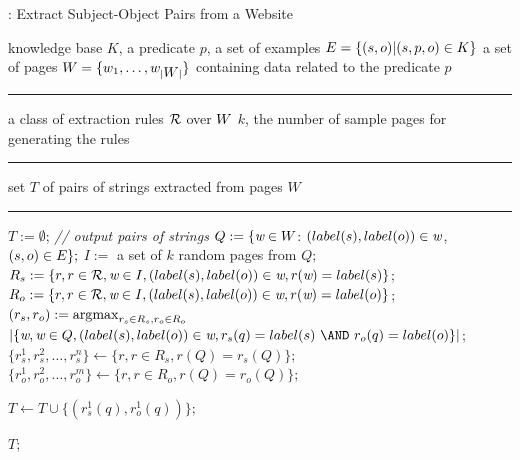 

\begin{algorithm}[tbh]
\caption{{\alfrex}: Extract Subject-Object Pairs from a Website}\label{lst:learning-wrappers}
\label{alg:alfrex}
\begin{algorithmic}[1]
\renewcommand{\algorithmicensure}{\textbf{Output:}}
\newcommand{\LET}{\mbox{\textbf{let}}}
\renewcommand{\algorithmicrequire}{\textbf{Input:}}
\REQUIRE knowledge base $K$, a predicate $p$, a set of examples $\mbox{\ensuremath{E}} = \{(s,o)|(s,p,o) \in K\}$
\REQUIRE a set of pages $\mbox{\ensuremath{W}}=\{w_1,\ldots,w_{|\mbox{\ensuremath{W}}|}\}$ containing data related to the predicate $p$
\smallskip\hrule\medskip
\renewcommand{\algorithmicrequire}{\textbf{Parameter:}}
\REQUIRE a class of extraction rules $\mathcal{R}$ over $\mbox{\ensuremath{W}}$
\REQUIRE $k$, the number of sample pages for generating the rules
\hrule\medskip
\ENSURE set $T$ of pairs of strings extracted from pages $W$
\smallskip\hrule\medskip
\STATE $T := \emptyset$; {\em // output pairs of strings}
\STATE $Q := \{\mbox{\em w} \in \mbox{\ensuremath{W}}$: $(label(s),label(o)) \in \mbox{\em w}$, $ (s, o) \in \mbox{\ensuremath{E}}\};$\label{lst:Q}
\STATE $I :=$ a set of $k$ random pages from $Q$;\label{lst:I}
\STATE $R_s := \{r, r \in \mathcal{R}, \mbox{\em w} \in I, (label(s), label(o)) \in \mbox{\em w}, r(\mbox{\em w}) = label(s)\}$;\label{lst:Rs}
\STATE $R_o := \{r, r \in \mathcal{R}, \mbox{\em w} \in I, (label(s), label(o)) \in \mbox{\em w}, r(\mbox{\em w}) = label(o)\}$;\label{lst:Ro}
\STATE $(r_s, r_o) := \operatorname*{\arg\!\max}_{r_s\in R_s, r_o \in R_o}$~~$|\{\page, \page \in Q, (\lab{s},\lab{o}) \in \page, r_s(q) = \lab{s}\ \AND\ r_o(q) = \lab{o}\}|$;\label{lst:best-pair}
\STATE $\{r_s^1,r_s^2,\ldots, r_s^n\} \leftarrow \{r, r \in R_s, r(Q)=r_s(Q) \}$;\label{lst:best-vector-s}
\STATE $\{r_o^1,r_o^2,\ldots, r_o^m\} \leftarrow \{r, r \in R_o, r(Q)=r_o(Q) \}$;\label{lst:best-vector-o}

\label{lst:forall-start}
    \label{lst:check}
    \STATE $T \leftarrow T \cup \{(r_s^1(q),r_o^1(q))\}$;
    \ENDIF
\ENDFOR\label{lst:forall-end}

\RETURN $T$;

\end{algorithmic}
\end{algorithm}

